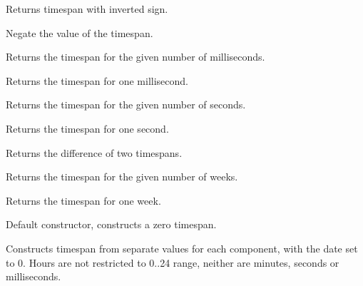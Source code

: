 
Returns timespan with inverted sign.


\label{wxtimespanneg}



Negate the value of the timespan.


\label{wxtimespanmilliseconds}


Returns the timespan for the given number of milliseconds.


\label{wxtimespanmillisecond}


Returns the timespan for one millisecond.


\label{wxtimespanseconds}


Returns the timespan for the given number of seconds.


\label{wxtimespansecond}


Returns the timespan for one second.


\label{wxtimespansubtract}




Returns the difference of two timespans.


\label{wxtimespanweeks}


Returns the timespan for the given number of weeks.


\label{wxtimespanweek}


Returns the timespan for one week.


\label{wxtimespanctor}


Default constructor, constructs a zero timespan.


Constructs timespan from separate values for each component, with the date
set to 0. Hours are not restricted to 0..24 range, neither are
minutes, seconds or milliseconds.

